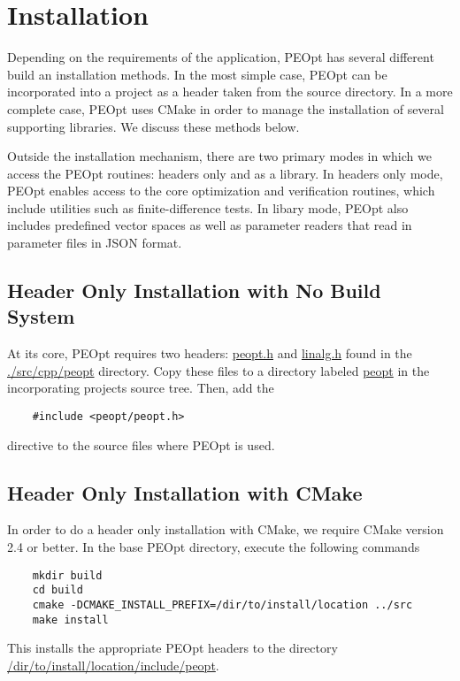 \documentclass{report}
\begin{document}




\chapter{Installation}\label{ch:Install}

    Depending on the requirements of the application, PEOpt has several different build an installation methods.  In the most simple case, PEOpt can be incorporated into a project as a header taken from the source directory.  In a more complete case, PEOpt uses CMake in order to manage the installation of several supporting libraries.  We discuss these methods below.

        Outside the installation mechanism, there are two primary modes in which we access the PEOpt routines: headers only and as a library.  In headers only mode, PEOpt enables access to the core optimization and verification routines, which include utilities such as finite-difference tests.  In libary mode, PEOpt also includes predefined vector spaces as well as parameter readers that read in parameter files in JSON format.

\section{Header Only Installation with No Build System}

        At its core, PEOpt requires two headers: \url{peopt.h} and \url{linalg.h} found in the \url{./src/cpp/peopt} directory.  Copy these files to a directory labeled \url{peopt} in the incorporating projects source tree.  Then, add the
\begin{verbatim}
    #include <peopt/peopt.h>
\end{verbatim}
directive to the source files where PEOpt is used.


\section{Header Only Installation with CMake}

        In order to do a header only installation with CMake, we require CMake version 2.4 or better.  In the base PEOpt directory, execute the following commands
\begin{verbatim}
    mkdir build
    cd build
    cmake -DCMAKE_INSTALL_PREFIX=/dir/to/install/location ../src
    make install
\end{verbatim}
This installs the appropriate PEOpt headers to the directory \url{/dir/to/install/location/include/peopt}.
\end{document}
